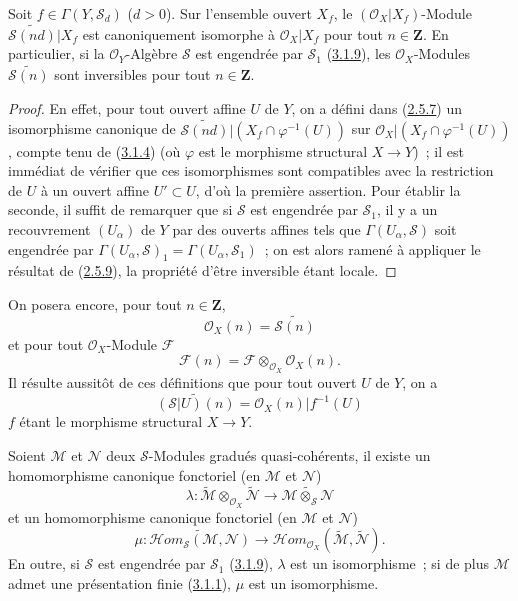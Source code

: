 \begin{proposition}[3.2.5]
\label{II.3.2.5-fr}
Soit $f\in\Gamma(Y,\mathcal{S}_d)$ ($d>0$). Sur l'ensemble ouvert $X_f$, le
$(\mathcal{O}_X|X_f)$-Module
$\widetilde{\mathcal{S}(nd)}|X_f$ est canoniquement isomorphe à
$\mathcal{O}_X|X_f$ pour tout $n\in\mathbf{Z}$. En particulier, si la
$\mathcal{O}_Y$-Algèbre $\mathcal{S}$ est engendrée par $\mathcal{S}_1$
(\hyperref[II.3.1.9-fr]{3.1.9}), les $\mathcal{O}_X$-Modules
$\widetilde{\mathcal{S}(n)}$ sont inversibles pour tout $n\in\mathbf{Z}$.
\end{proposition}

\begin{proof}
En effet, pour tout ouvert affine $U$ de $Y$, on a défini dans
(\hyperref[II.2.5.7-fr]{2.5.7}) un isomorphisme canonique de
$\widetilde{\mathcal{S}(nd)}|(X_f\cap\varphi^{-1}(U))$ sur
$\mathcal{O}_X|(X_f\cap\varphi^{-1}(U))$, compte tenu de
(\hyperref[II.3.1.4-fr]{3.1.4}) (où $\varphi$ est le morphisme structural
$X\to Y$)~; il est immédiat de vérifier que ces isomorphismes sont compatibles
avec la restriction de $U$ à un ouvert affine $U'\subset U$, d'où la première
assertion. Pour établir la seconde, il suffit de remarquer que si
$\mathcal{S}$ est engendrée par $\mathcal{S}_1$, il y a un recouvrement
$(U_\alpha)$ de $Y$ par des ouverts affines tels que
$\Gamma(U_\alpha,\mathcal{S})$ soit engendrée par
$\Gamma(U_\alpha,\mathcal{S})_1=\Gamma(U_\alpha,\mathcal{S}_1)$~; on est alors
ramené à appliquer le résultat de (\hyperref[II.2.5.9-fr]{2.5.9}), la
propriété d'être inversible étant locale.
\end{proof}

On posera encore, pour tout $n\in\mathbf{Z}$,
\[
\label{II.3.2.5.1-fr}
  \mathcal{O}_X(n)=\widetilde{\mathcal{S}(n)}
\tag{3.2.5.1}
\]
et pour tout $\mathcal{O}_X$-Module $\mathcal{F}$
\[
\label{II.3.2.5.2-fr}
  \mathcal{F}(n)=\mathcal{F}\otimes_{\mathcal{O}_X}\mathcal{O}_X(n).
\tag{3.2.5.2}
\]
Il résulte aussitôt de ces définitions que pour tout ouvert $U$ de $Y$, on a
\[
  \widetilde{(\mathcal{S}|U)(n)}
  =\mathcal{O}_X(n)|f^{-1}(U)
\]
$f$ étant le morphisme structural $X\to Y$.

\begin{proposition}[3.2.6]
\label{II.3.2.6-fr}
Soient $\mathcal{M}$ et $\mathcal{N}$ deux $\mathcal{S}$-Modules gradués
quasi-cohérents, il existe un homomorphisme canonique fonctoriel (en
$\mathcal{M}$ et $\mathcal{N}$)
\[
\label{II.3.2.6.1-fr}
  \lambda:\widetilde{\mathcal{M}}
  \otimes_{\mathcal{O}_X}\widetilde{\mathcal{N}}
  \longrightarrow\widetilde{\mathcal{M}\otimes_{\mathcal{S}}\mathcal{N}}
\tag{3.2.6.1}
\]
et un homomorphisme canonique fonctoriel (en $\mathcal{M}$ et
$\mathcal{N}$)
\[
\label{II.3.2.6.2-fr}
  \mu:\widetilde{\mathcal{H}om_{\mathcal{S}}(\mathcal{M},\mathcal{N})}
  \longrightarrow
  \mathcal{H}om_{\mathcal{O}_X}
  (\widetilde{\mathcal{M}},\widetilde{\mathcal{N}}).
\tag{3.2.6.2}
\]
En outre, si $\mathcal{S}$ est engendrée par $\mathcal{S}_1$
(\hyperref[II.3.1.9-fr]{3.1.9}), $\lambda$ est un isomorphisme~; si de plus
$\mathcal{M}$ admet une présentation finie
(\hyperref[II.3.1.1-fr]{3.1.1}), $\mu$ est un isomorphisme.
\end{proposition}

